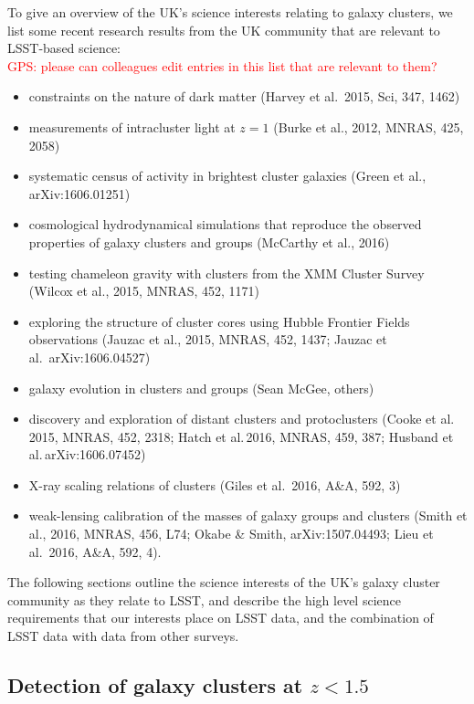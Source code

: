 \documentclass[a4paper,11pt]{article}
\newcommand{\red}{\textcolor{red}}
\begin{document}
To give an overview of the UK's science interests relating to galaxy
clusters, we list some recent research results from the UK community
that are relevant to LSST-based science: \\\red{GPS: please can
  colleagues edit entries in this list that are relevant to them?}
\begin{itemize}
\item constraints on the nature of dark matter (Harvey et al.\ 2015,
  Sci, 347, 1462)
\item measurements of intracluster light at $z=1$ (Burke et al., 2012,
  MNRAS, 425, 2058)
\item systematic census of activity in brightest cluster galaxies
  (Green et al., arXiv:1606.01251)
\item cosmological hydrodynamical simulations that reproduce the
  observed properties of galaxy clusters and groups (McCarthy et al.,
  2016)
\item testing chameleon gravity with clusters from the XMM Cluster
  Survey (Wilcox et al., 2015, MNRAS, 452, 1171)
\item exploring the structure of cluster cores using Hubble Frontier
  Fields observations (Jauzac et al., 2015, MNRAS, 452, 1437; Jauzac
  et al.\ arXiv:1606.04527)
\item galaxy evolution in clusters and groups (Sean McGee, others)

\item discovery and exploration of distant clusters and protoclusters (Cooke et al.\,2015, MNRAS, 452, 2318; Hatch et al.\,2016, MNRAS, 459, 387; Husband et al.\,arXiv:1606.07452)

\item X-ray scaling relations of clusters (Giles et al.\ 2016, A\&A,
  592, 3)
\item weak-lensing calibration of the masses of galaxy groups and
  clusters (Smith et al., 2016, MNRAS, 456, L74; Okabe \& Smith,
  arXiv:1507.04493; Lieu et al.\ 2016, A\&A, 592, 4).
\end{itemize}
The following sections outline the science interests of the UK's
galaxy cluster community as they relate to LSST, and describe the high
level science requirements that our interests place on LSST data, and
the combination of LSST data with data from other surveys.

\subsection{Detection of galaxy clusters at $z<1.5$}\label{sec:clusdet}
\end{document}
